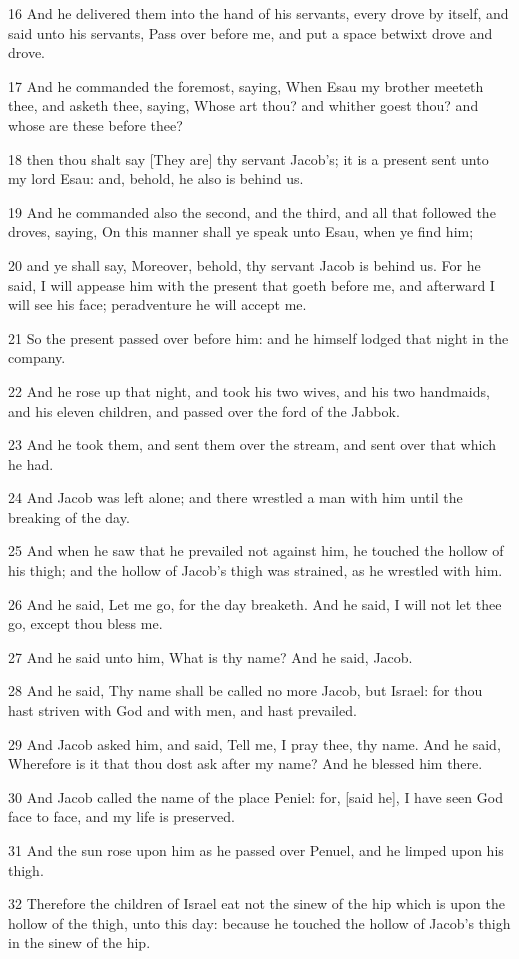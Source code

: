 \par 16 And he delivered them into the hand of his servants, every drove by itself, and said unto his servants, Pass over before me, and put a space betwixt drove and drove.
\par 17 And he commanded the foremost, saying, When Esau my brother meeteth thee, and asketh thee, saying, Whose art thou? and whither goest thou? and whose are these before thee?
\par 18 then thou shalt say [They are] thy servant Jacob's; it is a present sent unto my lord Esau: and, behold, he also is behind us.
\par 19 And he commanded also the second, and the third, and all that followed the droves, saying, On this manner shall ye speak unto Esau, when ye find him;
\par 20 and ye shall say, Moreover, behold, thy servant Jacob is behind us. For he said, I will appease him with the present that goeth before me, and afterward I will see his face; peradventure he will accept me.
\par 21 So the present passed over before him: and he himself lodged that night in the company.
\par 22 And he rose up that night, and took his two wives, and his two handmaids, and his eleven children, and passed over the ford of the Jabbok.
\par 23 And he took them, and sent them over the stream, and sent over that which he had.
\par 24 And Jacob was left alone; and there wrestled a man with him until the breaking of the day.
\par 25 And when he saw that he prevailed not against him, he touched the hollow of his thigh; and the hollow of Jacob's thigh was strained, as he wrestled with him.
\par 26 And he said, Let me go, for the day breaketh. And he said, I will not let thee go, except thou bless me.
\par 27 And he said unto him, What is thy name? And he said, Jacob.
\par 28 And he said, Thy name shall be called no more Jacob, but Israel: for thou hast striven with God and with men, and hast prevailed.
\par 29 And Jacob asked him, and said, Tell me, I pray thee, thy name. And he said, Wherefore is it that thou dost ask after my name? And he blessed him there.
\par 30 And Jacob called the name of the place Peniel: for, [said he], I have seen God face to face, and my life is preserved.
\par 31 And the sun rose upon him as he passed over Penuel, and he limped upon his thigh.
\par 32 Therefore the children of Israel eat not the sinew of the hip which is upon the hollow of the thigh, unto this day: because he touched the hollow of Jacob's thigh in the sinew of the hip.

